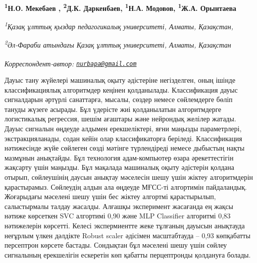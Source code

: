
\begin{articleheader}

{\bfseries
\textsuperscript{1}Н.О. Мекебаев\textsuperscript{\envelope } ,
\textsuperscript{2}Д.К. Даркенбаев,
\textsuperscript{1}Н.А. Модовов,
\textsuperscript{1}Ж.А. Орынтаева}
\end{articleheader}

\begin{affiliation}
{\em \textsuperscript{1}Қазақ ұлттық қыздар педагогикалық университеті, Алматы, Қазақстан,}

{\em \textsuperscript{2}Әл-Фараби атындағы Қазақ ұлттық университеті, Алматы, Қазақстан}

\raggedright \textsuperscript{\envelope }{\em Корреспондент-автор: \href{mailto:nurbapa@gmail.com}{\nolinkurl{nurbapa@gmail.com}}}
\end{affiliation}

Дауыс тану жүйелері машиналық оқыту әдістеріне негізделген, оның ішінде
классификациялық алгоритмдер кеңінен қолданылады. Классификация дауыс
сигналдарын әртүрлі санаттарға, мысалы, сөздер немесе сөйлемдерге бөліп
тануды жүзеге асырады. Бұл үдерісте жиі қолданылатын алгоритмдерге
логистикалық регрессия, шешім ағаштары және нейрондық желілер жатады.
Дауыс сигналын өңдеуде алдымен ерекшеліктері, яғни маңызды параметрлері,
экстракцияланады, содан кейін олар классификаторға беріледі.
Классификация нәтижесінде жүйе сөйлеген сөзді мәтінге түрлендіреді
немесе дыбыстың нақты мазмұнын анықтайды. Бұл технология адам-компьютер
өзара әрекеттестігін жақсарту үшін маңызды. Бұл мақалада машиналық оқыту
әдістерін қолдана отырып, сөйлеушінің даусын анықтау мәселесін шешу үшін
жіктеу алгоритмдерін қарастырамыз. Сөйлеудің алдын ала өңдеуде МҒСС-ті
алгортимін пайдаландық. Жоғарыдағы мәселені шешу үшін бес жіктеу
алгортмі қарастырылып, салыстырмалы талдау жасалды. Алғашқы эксперимент
жасағанда ең жақсы нәтиже көрсеткен SVC алгортимі 0,90 және MLP
Classifier алгоритмі 0,83 нәтижелерін көрсетті. Келесі экспермиентте
жеке тұлғаның дауысын анықтауда неғұрлым үлкен дәлдікте Robust scaler
әдісімен масштабтауда -- 0,93 көпқабатты персептрон көрсете бастады.
Сондықтан бұл мәселені шешу үшін сөйлеу сигналының ерекшелігін ескеретін
көп қабатты перцептронды қолдануға болады.

